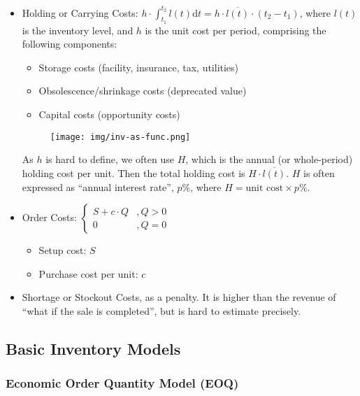 \documentclass{article}
\begin{document}
\begin{itemize}
	\item Holding or Carrying Costs: $h \cdot \int_{t_1} ^{t_2} l(t) \text{d}t = h\cdot \overline{l(t)}\cdot (t_2 - t_1)$,
	      where $l(t)$ is the inventory level, and $h$ is the unit cost per period,
	      comprising the following components:
	      \begin{itemize}
		      \item Storage costs (facility, insurance, tax, utilities)
		      \item Obsolescence/shrinkage costs (deprecated value)
		      \item Capital costs (opportunity costs)
	      \end{itemize}
	      \begin{figure}[H]
		      \centering
		      \texttt{[image: img/inv-as-func.png]}
	      \end{figure}
	      As $h$ is hard to define, we often use $H$,
	      which is the annual (or whole-period) holding cost per unit.
	      Then the total holding cost is $H\cdot \overline{l(t)}$.
	      $H$ is often expressed as ``annual interest rate'', $p\%$,
	      where $H = \text{unit cost} \times p\%$.
	\item Order Costs: $
		      \left\{
		      \begin{array}{ll}
			      S+c\cdot Q & , Q > 0 \\
			      0          & , Q = 0
		      \end{array}
		      \right.
	      $
	      \begin{itemize}
		      \item Setup cost: $S$
		      \item Purchase cost per unit: $c$
	      \end{itemize}
	\item Shortage or Stockout Costs, as a penalty.
	      It is higher than the revenue of ``what if the sale is completed'',
	      but is hard to estimate precisely.
\end{itemize}

\subsection{Basic Inventory Models}

\subsubsection{Economic Order Quantity Model (EOQ)}
\end{document}
